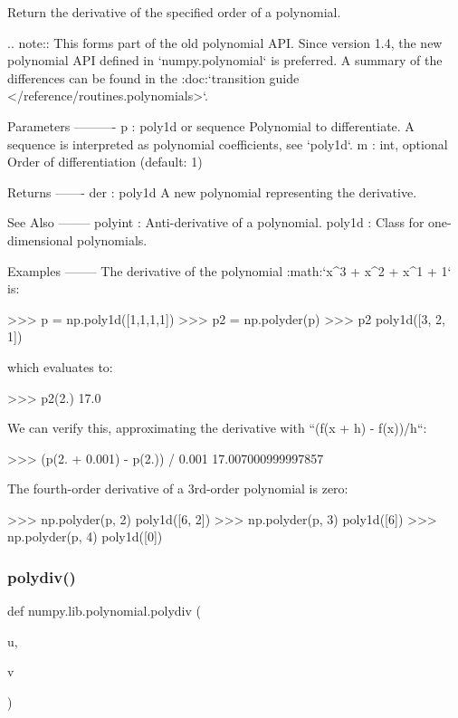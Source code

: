 \begin{DoxyVerb}Return the derivative of the specified order of a polynomial.

.. note::
   This forms part of the old polynomial API. Since version 1.4, the
   new polynomial API defined in `numpy.polynomial` is preferred.
   A summary of the differences can be found in the
   :doc:`transition guide </reference/routines.polynomials>`.

Parameters
----------
p : poly1d or sequence
    Polynomial to differentiate.
    A sequence is interpreted as polynomial coefficients, see `poly1d`.
m : int, optional
    Order of differentiation (default: 1)

Returns
-------
der : poly1d
    A new polynomial representing the derivative.

See Also
--------
polyint : Anti-derivative of a polynomial.
poly1d : Class for one-dimensional polynomials.

Examples
--------
The derivative of the polynomial :math:`x^3 + x^2 + x^1 + 1` is:

>>> p = np.poly1d([1,1,1,1])
>>> p2 = np.polyder(p)
>>> p2
poly1d([3, 2, 1])

which evaluates to:

>>> p2(2.)
17.0

We can verify this, approximating the derivative with
``(f(x + h) - f(x))/h``:

>>> (p(2. + 0.001) - p(2.)) / 0.001
17.007000999997857

The fourth-order derivative of a 3rd-order polynomial is zero:

>>> np.polyder(p, 2)
poly1d([6, 2])
>>> np.polyder(p, 3)
poly1d([6])
>>> np.polyder(p, 4)
poly1d([0])\end{DoxyVerb}
 \mbox{\label{namespacenumpy_1_1lib_1_1polynomial_a1f6f7f494f1c679c43d2033c574c2f82}} 
\subsubsection{\texorpdfstring{polydiv()}{polydiv()}}
{\footnotesize\ttfamily def numpy.\+lib.\+polynomial.\+polydiv (\begin{DoxyParamCaption}\item[{}]{u,  }\item[{}]{v }\end{DoxyParamCaption})}

